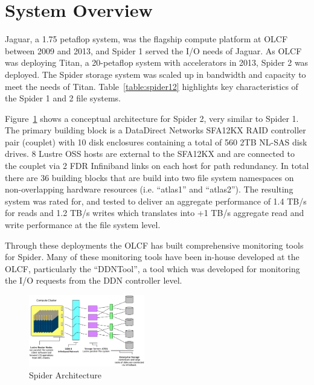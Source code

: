 \section{System Overview}
\label{sec:overview}

Jaguar, a 1.75 petaflop system, was the flagship compute platform at OLCF between
2009 and 2013, and Spider 1 served the I/O needs of Jaguar. As OLCF was
deploying Titan, a 20-petaflop system with accelerators in 2013, Spider 2 was
deployed. The Spider storage system was scaled up in bandwidth and capacity 
to meet the needs of Titan. Table~\ref{table:spider12} highlights key 
characteristics of the Spider 1 and 2 file systems. 


Figure~\ref{fig:arch} shows a conceptual architecture for Spider 2, very similar to Spider 1. 
The primary building block is a DataDirect Networks SFA12KX RAID controller
pair (couplet) with 10 disk enclosures containing a total of 560 2TB NL-SAS disk drives.
8 Lustre OSS hosts are external to the SFA12KX and are connected to the couplet
via 2 FDR Infiniband links on each host for path redundancy. In total there are
36 building blocks that are build into two file system namespaces on
non-overlapping hardware resources (i.e. ``atlas1'' and ``atlas2''). The
resulting system was rated for, and tested to deliver an aggregate performance of 1.4 TB/s
for reads and 1.2 TB/s writes which translates into +1 TB/s aggregate read and
write performance at the file system level.



Through these deployments the OLCF has built comprehensive
monitoring tools for Spider\cite{ddntool10:ross}. Many of these monitoring
tools have been in-house developed at the OLCF, particularly the ``DDNTool'', a
tool which was developed for monitoring the I/O requests from the DDN
controller level. 



\begin{figure}[!t]
\centering
\includegraphics[width=0.45\textwidth]{./figs/spider2arch.ps}
\vspace{-0.1in}
\centering
\caption{Spider Architecture}
\label{fig:arch}
\end{figure}

